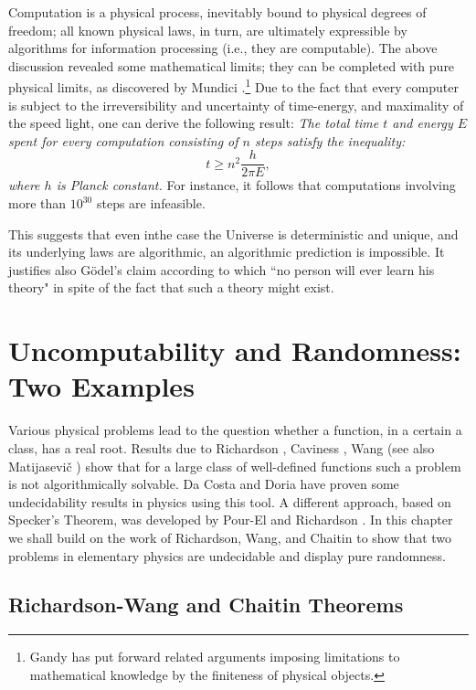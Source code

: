 Computation is a physical
process, inevitably  bound to physical degrees of freedom; all known
physical laws, in
turn,
are ultimately expressible by algorithms for information processing (i.e.,
they are computable). The above
discussion revealed some mathematical limits; they can be completed with pure
physical limits, as discovered by Mundici \cite{mundici}.\footnote{Gandy
\cite{gandy1,gandy2}
 has put forward  related  arguments  imposing limitations to
mathematical knowledge by the finiteness of physical objects.} Due to the
fact that
 every computer is
subject to the irreversibility and uncertainty of time-energy, and
maximality of the speed light, one can derive the following result: {\it
The total time
$t$ and energy $E$ spent for every computation consisting of $n$ steps satisfy
the inequality:}
\[t \geq n^{2} \frac{h}{2\pi E},\]
{\it where $h$ is Planck constant.} For instance, it follows that
computations involving
more than $10^{30}$
steps are
 infeasible.

This suggests that even inthe case the Universe is deterministic and unique,
and its underlying laws are algorithmic, an algorithmic prediction is
impossible. It justifies
also  G\" odel's
 claim
according to which
``no person will ever learn his theory"
in spite of the fact  that such a theory might exist.




\section{Uncomputability and Randomness: Two Examples}

Various  physical problems  lead to the question whether a
function, in a certain a class, has a real root. Results due to
Richardson \cite{richardson}, Caviness \cite{caviness}, Wang \cite{wang} (see
also Matijasevi\v{c} \cite{matia})
show that for a large class of well-defined functions such a problem
is not algorithmically solvable.  Da Costa and  Doria  \cite{costa}
have proven some undecidability  results in physics using this tool.
A different approach, based on Specker's Theorem, was developed by Pour-El
and Richardson \cite{pour-el}.
In this chapter we shall build on the work of Richardson, Wang,
and Chaitin to show that two problems in
elementary physics are undecidable and display pure randomness.

\subsection{Richardson-Wang and Chaitin Theorems}



